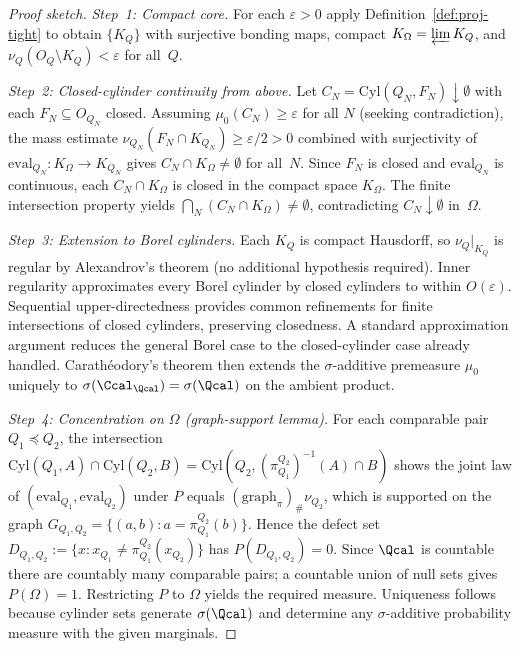 \begin{proof}[Proof sketch]
\textit{Step~1: Compact core.}
For each $\varepsilon>0$ apply Definition~\ref{def:proj-tight} to
obtain $\{K_Q\}$ with surjective bonding maps, compact $K_\Omega=\varprojlim K_Q$,
and $\nu_Q(O_Q\setminus K_Q)<\varepsilon$ for all~$Q$.

\medskip
\noindent\textit{Step~2: Closed-cylinder continuity from above.}
Let $C_N=\mathrm{Cyl}(Q_N,F_N)\downarrow\emptyset$ with each $F_N\subseteq O_{Q_N}$
closed.  Assuming $\mu_0(C_N)\ge\varepsilon$ for all $N$ (seeking contradiction),
the mass estimate $\nu_{Q_N}(F_N\cap K_{Q_N})\ge\varepsilon/2>0$ combined with
surjectivity of $\mathrm{eval}_{Q_N}:K_\Omega\to K_{Q_N}$ gives
$C_N\cap K_\Omega\ne\emptyset$ for all~$N$.
Since $F_N$ is closed and $\mathrm{eval}_{Q_N}$ is continuous, each
$C_N\cap K_\Omega$ is closed in the compact space $K_\Omega$.
The finite intersection property yields
$\bigcap_N(C_N\cap K_\Omega)\ne\emptyset$,
contradicting $C_N\downarrow\emptyset$ in~$\Omega$.

\medskip
\noindent\textit{Step~3: Extension to Borel cylinders.}
Each $K_Q$ is compact Hausdorff, so $\nu_Q|_{K_Q}$ is regular by
Alexandrov's theorem (no additional hypothesis required).
Inner regularity approximates every Borel cylinder by closed cylinders
to within $O(\varepsilon)$.
Sequential upper-directedness provides common refinements for finite
intersections of closed cylinders, preserving closedness.
A standard approximation argument reduces the general Borel case to
the closed-cylinder case already handled.
Carathéodory's theorem then extends the $\sigma$-additive premeasure
$\mu_0$ uniquely to $\sigma(\Ccal_{\Qcal})=\sigma(\Qcal)$ on the
ambient product.

\medskip
\noindent\textit{Step~4: Concentration on $\Omega$ (graph-support lemma).}
For each comparable pair $Q_1\preceq Q_2$, the intersection
$\mathrm{Cyl}(Q_1,A)\cap\mathrm{Cyl}(Q_2,B)=\mathrm{Cyl}(Q_2,(\pi^{Q_2}_{Q_1})^{-1}(A)\cap B)$
shows the joint law of $(\mathrm{eval}_{Q_1},\mathrm{eval}_{Q_2})$ under $P$
equals $(\mathrm{graph}_{\pi})_\#\nu_{Q_2}$, which is supported on
the graph $G_{Q_1,Q_2}=\{(a,b):a=\pi^{Q_2}_{Q_1}(b)\}$.
Hence the defect set $D_{Q_1,Q_2}:=\{x:x_{Q_1}\ne\pi^{Q_2}_{Q_1}(x_{Q_2})\}$
has $P(D_{Q_1,Q_2})=0$.
Since $\Qcal$ is countable there are countably many comparable pairs;
a countable union of null sets gives $P(\Omega)=1$.
Restricting $P$ to $\Omega$ yields the required measure.
Uniqueness follows because cylinder sets generate $\sigma(\Qcal)$
and determine any $\sigma$-additive probability measure with the
given marginals.
\end{proof}

